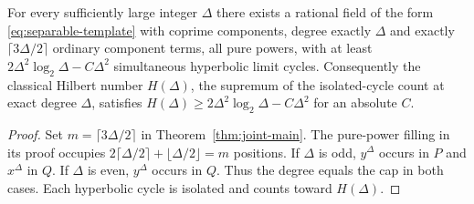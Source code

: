 \begin{corollary}\label{cor:degree-only}
For every sufficiently large integer \(\Delta\) there exists a rational field of the form \eqref{eq:separable-template} with coprime components, degree exactly \(\Delta\) and exactly \(\lceil3\Delta/2\rceil\) ordinary component terms, all pure powers, with at least \(2\Delta^2\log_2\Delta-C\Delta^2\) simultaneous hyperbolic limit cycles. Consequently the classical Hilbert number \(H(\Delta)\), the supremum of the isolated-cycle count at exact degree \(\Delta\), satisfies \(H(\Delta)\ge 2\Delta^2\log_2\Delta-C\Delta^2\) for an absolute \(C\).
\end{corollary}
\begin{proof}
Set \(m=\lceil3\Delta/2\rceil\) in Theorem~\ref{thm:joint-main}. The pure-power filling in its proof occupies \(2\lceil\Delta/2\rceil+\lfloor\Delta/2\rfloor=m\) positions. If \(\Delta\) is odd, \(y^\Delta\) occurs in \(P\) and \(x^\Delta\) in \(Q\). If \(\Delta\) is even, \(y^\Delta\) occurs in \(Q\). Thus the degree equals the cap in both cases. Each hyperbolic cycle is isolated and counts toward \(H(\Delta)\).
\end{proof}

